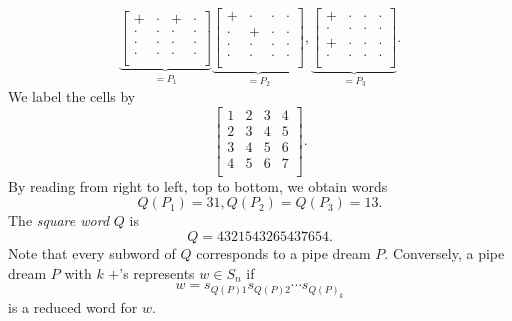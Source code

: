 \documentclass[co439]{subfiles}
\begin{document}
\begin{example}{}
\begin{equation*}
            \underbrace{\begin{bmatrix}
            	+ & \cdot & + & \cdot \\
            	\cdot & \cdot & \cdot & \cdot \\
            	\cdot & \cdot & \cdot & \cdot \\
            	\cdot & \cdot & \cdot & \cdot \\
            \end{bmatrix}}_{=P_1}
            \underbrace{\begin{bmatrix}
            	+ & \cdot & \cdot & \cdot \\
            	\cdot & + & \cdot & \cdot \\
            	\cdot & \cdot & \cdot & \cdot \\
            	\cdot & \cdot & \cdot & \cdot \\
            \end{bmatrix}}_{=P_2},
            \underbrace{\begin{bmatrix}
            	+ & \cdot & \cdot & \cdot \\
            	\cdot & \cdot & \cdot & \cdot \\
            	+ & \cdot & \cdot & \cdot \\
            	\cdot & \cdot & \cdot & \cdot \\
            \end{bmatrix}}_{=P_3}.
        \end{equation*}
        We label the cells by
        \begin{equation*}
            \begin{bmatrix}
            	1 & 2 & 3 & 4 \\
            	2 & 3 & 4 & 5 \\
            	3 & 4 & 5 & 6 \\
            	4 & 5 & 6 & 7 \\
            \end{bmatrix}.
        \end{equation*}
        By reading from right to left, top to bottom, we obtain words
        \begin{equation*}
            Q\left( P_1 \right) = 31, Q\left( P_2 \right) = Q\left( P_3 \right) = 13.
        \end{equation*}
        The \emph{square word} $Q$ is
        \begin{equation*}
            Q = 4321543265437654.
        \end{equation*}
        Note that every subword of $Q$ corresponds to a pipe dream $P$. Conversely, a pipe dream $P$ with $k$ $+$'s represents $w\in S_n$ if
        \begin{equation*}
            w = s_{Q\left( P \right)1}s_{Q\left( P \right)2}\cdots s_{Q\left( P \right)_k}
        \end{equation*}
        is a reduced word for $w$.


\end{example}
\end{document}
